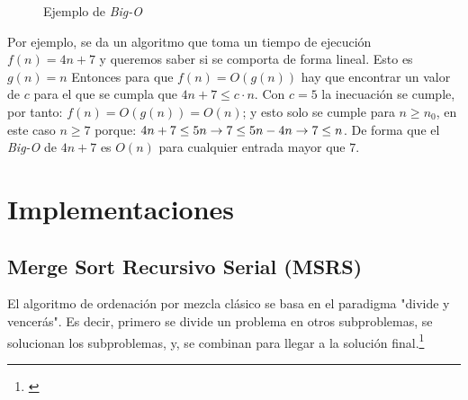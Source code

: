 \documentclass[titlepage]{article}
\begin{document}
\begin{figure}
\captionsetup{justification=centering}
\centering    
    
    \caption{Ejemplo de \textit{Big-O}}
    \label{fig:bigO}
    
\end{figure}

Por ejemplo, se da un algoritmo que toma un tiempo de ejecución \(f(n) = 4n+7\) y queremos saber si se comporta de forma lineal. Esto es \(g(n)=n\) Entonces para que \(f(n) = O(g(n))\) hay que encontrar un valor de \(c\) para el que se cumpla que \(4n+7 \leq c\cdot n\). Con \(c=5\) la inecuación se cumple, por tanto: \(f(n) = O(g(n)) = O(n)\); y esto solo se cumple para \(n \geq n_0\), en este caso \(n\geq 7\) porque: \(4n+7 \leq 5n \space \rightarrow 7 \leq 5n - 4n   \rightarrow 7 \leq n\). De forma que el \textit{Big-O} de \(4n+7\) es \(O(n)\) para cualquier entrada mayor que \(7\).



\section{Implementaciones}

\subsection{Merge Sort Recursivo Serial (MSRS)}
El algoritmo de ordenación por mezcla clásico se basa en el paradigma "divide y vencerás". Es decir, primero se divide un problema en otros subproblemas, se solucionan los subproblemas, y, se combinan para llegar a la solución
final.\footnote{\cite{Sedgewick2003-cd}}
\end{document}
